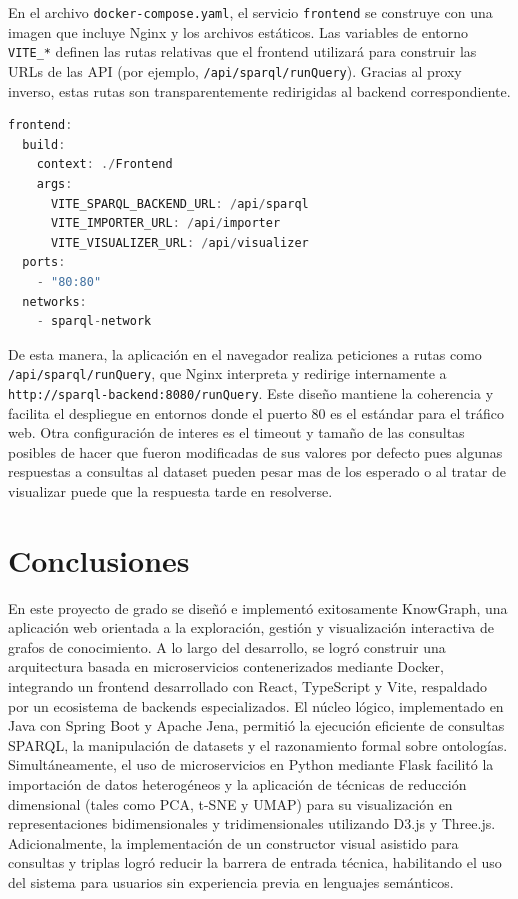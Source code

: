 \documentclass{article}
\begin{document}
En el archivo \texttt{docker-compose.yaml}, el servicio \texttt{frontend} se construye con una imagen que incluye Nginx y los archivos estáticos. Las variables de entorno \texttt{VITE\_*} definen las rutas relativas que el frontend utilizará para construir las URLs de las API (por ejemplo, \texttt{/api/sparql/runQuery}). Gracias al proxy inverso, estas rutas son transparentemente redirigidas al backend correspondiente.

\begin{lstlisting}[language=java, basicstyle=\small\ttfamily]
frontend:
  build:
    context: ./Frontend
    args:
      VITE_SPARQL_BACKEND_URL: /api/sparql
      VITE_IMPORTER_URL: /api/importer
      VITE_VISUALIZER_URL: /api/visualizer
  ports:
    - "80:80"
  networks:
    - sparql-network
\end{lstlisting}

De esta manera, la aplicación en el navegador realiza peticiones a rutas como \texttt{/api/sparql/runQuery}, que Nginx interpreta y redirige internamente a \texttt{http://sparql-backend:8080/runQuery}. Este diseño mantiene la coherencia y facilita el despliegue en entornos donde el puerto 80 es el estándar para el tráfico web. Otra configuración de interes es el timeout y tamaño de las consultas posibles de hacer que fueron modificadas de sus valores por defecto pues algunas respuestas a consultas al dataset pueden pesar mas de los esperado o al tratar de visualizar puede que la respuesta tarde en resolverse.

\section{Conclusiones}

En este proyecto de grado se diseñó e implementó exitosamente KnowGraph, una aplicación web orientada a la exploración, gestión y visualización interactiva de grafos de conocimiento. A lo largo del desarrollo, se logró construir una arquitectura basada en microservicios contenerizados mediante Docker, integrando un frontend desarrollado con React, TypeScript y Vite, respaldado por un ecosistema de backends especializados. El núcleo lógico, implementado en Java con Spring Boot y Apache Jena, permitió la ejecución eficiente de consultas SPARQL, la manipulación de datasets y el razonamiento formal sobre ontologías. Simultáneamente, el uso de microservicios en Python mediante Flask facilitó la importación de datos heterogéneos y la aplicación de técnicas de reducción dimensional (tales como PCA, t-SNE y UMAP) para su visualización en representaciones bidimensionales y tridimensionales utilizando D3.js y Three.js. Adicionalmente, la implementación de un constructor visual asistido para consultas y triplas logró reducir la barrera de entrada técnica, habilitando el uso del sistema para usuarios sin experiencia previa en lenguajes semánticos.
\end{document}
